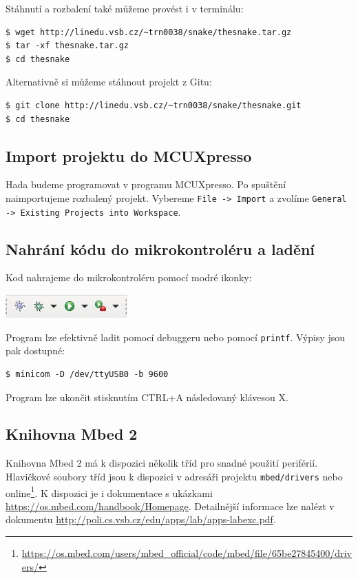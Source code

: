 \documentclass[12pt]{article}
\begin{document}
Stáhnutí a rozbalení také můžeme provést i v terminálu:
\begin{verbatim}
$ wget http://linedu.vsb.cz/~trn0038/snake/thesnake.tar.gz
$ tar -xf thesnake.tar.gz
$ cd thesnake 
\end{verbatim}

Alternativně si můžeme stáhnout projekt z Gitu:
\begin{verbatim}
$ git clone http://linedu.vsb.cz/~trn0038/snake/thesnake.git
$ cd thesnake
\end{verbatim}

\subsection{Import projektu do MCUXpresso}
Hada budeme programovat v programu MCUXpresso.
Po spuštění naimportujeme rozbalený projekt.
Vybereme \texttt{File -> Import} a zvolíme \texttt{General -> Existing Projects into Workspace}.

\subsection{Nahrání kódu do mikrokontroléru a ladění}
Kod nahrajeme do mikrokontroléru pomocí modré ikonky:

\begin{center}
\includegraphics{figures/blue-debug.jpg}
\end{center}

Program lze efektivně ladit pomocí debuggeru nebo pomocí \texttt{printf}.
Výpisy jsou pak dostupné:
\begin{verbatim}
$ minicom -D /dev/ttyUSB0 -b 9600
\end{verbatim}
Program lze ukončit stisknutím \textsc{CTRL+A} následovaný klávesou \textsc{X}.

\subsection{Knihovna Mbed 2}
Knihovna Mbed 2 má k dispozici několik tříd pro snadné použití periférií.
Hlavičkové soubory tříd jsou k dispozici v adresáři projektu \texttt{mbed/drivers} nebo online\footnote{\url{https://os.mbed.com/users/mbed_official/code/mbed/file/65be27845400/drivers/}}.
K dispozici je i dokumentace s ukázkami \url{https://os.mbed.com/handbook/Homepage}.
Detailnější informace lze nalézt v dokumentu \url{http://poli.cs.vsb.cz/edu/apps/lab/apps-labexc.pdf}.
\end{document}
